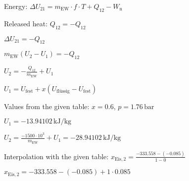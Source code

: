 Energy:
\( \Delta U_{21} = m_{\text{EW}} \cdot f \cdot T + Q_{12} - W_{\text{n}} \)

Released heat:
\( Q_{12} = -Q_{12} \)

\( \Delta U_{21} = -Q_{12} \)

\( m_{\text{EW}} (U_2 - U_1) = -Q_{12} \)

\( U_2 = -\frac{Q_{12}}{m_{\text{EW}}} + U_1 \)

\( U_1 = U_{\text{fest}} + x (U_{\text{flüssig}} - U_{\text{fest}}) \)

Values from the given table:
\( x = 0.6 \), \( p = 1.76 \, \text{bar} \)

\( U_1 = -13.94102 \, \text{kJ/kg} \)

\( U_2 = \frac{-1500 \cdot 10^3}{m_{\text{EW}}} + U_1 = -28.94102 \, \text{kJ/kg} \)

Interpolation with the given table:
\( x_{\text{Eis},2} = \frac{-333.558 - (-0.085)}{1 - 0} \)

\( x_{\text{Eis},2} = -333.558 - (-0.085) + 1 \cdot 0.085 \)